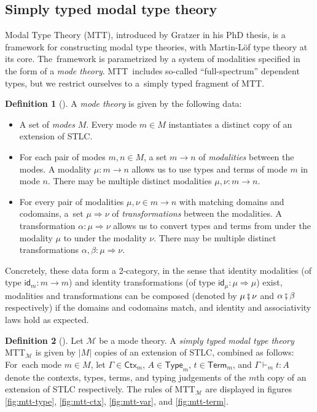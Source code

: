 \documentclass{scrartcl}
\theoremstyle{definition}
\newtheorem{definition}{Definition}
\theoremstyle{plain}
\newcommand{\MTTM}{MTT${}_{\mathcal{M}}$}
\begin{document}

\subsection{Simply typed modal type theory}
Modal Type Theory (MTT), introduced by Gratzer in his PhD
thesis\cite{gratzer2023syntax}, is a framework for constructing modal type
theories, with Martin-Löf type theory at its core. The~framework is
parametrized by a system of modalities specified in the form of a \emph{mode
theory}. MTT~includes so-called ``full-spectrum'' dependent types, but we
restrict ourselves to a~simply typed fragment of MTT.
\begin{definition}[{\cite[§6.1.1]{gratzer2023syntax}}]
  A \emph{mode theory} is given by the following data:
  \begin{itemize}
  \item
    A set of \emph{modes} $M$. Every mode $m \in M$ instantiates a distinct
    copy of an extension of STLC.
  \item
    For each pair of modes $m, n \in M$, a set $m \to n$ of \emph{modalities}
    between the modes. A modality $\mu : m \to n$ allows us to use types and
    terms of mode $m$ in mode $n$. There may be multiple distinct modalities
    $\mu , \nu : m \to n$.
  \item
    For every pair of modalities $\mu, \nu \in m \to n$ with matching domains
    and codomains, a~set $\mu \Rightarrow \nu$ of \emph{transformations}
    between the modalities. A transformation $\alpha : \mu \Rightarrow \nu$
    allows us to convert types and terms from under the modality $\mu$ to under
    the modality $\nu$. There may be multiple distinct transformations $\alpha,
    \beta : \mu \Rightarrow \nu$.
  \end{itemize}
  Concretely, these data form a 2-category, in the sense that identity
  modalities (of type $\textsf{id}_m : m \to m$) and identity transformations
  (of type $\textsf{id}_\mu : \mu \Rightarrow \mu $) exist, modalities and
  transformations can be composed (denoted by $\mu \fatsemi \nu$ and $\alpha
  \fatsemi \beta$ respectively) if the domains and codomains match, and
  identity and associativity laws hold as expected\cite{licata2016adjoint}.
\end{definition}
\begin{definition}[{\cite[following §6.2]{gratzer2023syntax}}]
  Let $\mathcal{M}$ be a mode theory. A \emph{simply typed modal type theory}
  \MTTM{} is given by $|M|$ copies of an extension of STLC, combined as
  follows: For~each mode $m \in M$, let $\Gamma\in\textsf{Ctx}_m$, $A \in
  \textsf{Type}_m$, $t \in \textsf{Term}_m$, and $\Gamma \vdash_m t : A$ denote
  the contexts, types, terms, and typing judgements of the $m$th copy of an
  extension of STLC respectively. The rules of \MTTM{} are displayed in figures
  \ref{fig:mtt-type}, \ref{fig:mtt-ctx}, \ref{fig:mtt-var}, and
  \ref{fig:mtt-term}.
\end{definition}
\end{document}
